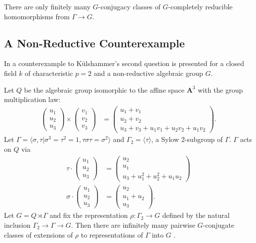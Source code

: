 \begin{theorem} \label{thm:finiteGCR} There are only finitely many $G$-conjugacy classes of $G$-completely reducible homomorphisms from $\Gamma\rightarrow G$.
\end{theorem}
\subsection{A Non-Reductive Counterexample}
In \cite{slodowy1997two} a counterexample to K\"ulshammer's second question is presented for a closed field $k$ of characteristic $p = 2$ and a non-reductive algebraic group $G$.
\begin{example} Let $Q$ be the algebraic group isomorphic to the affine space $\mathbf{A}^3$ with the group multiplication law:
\begin{align*}
	\left(\begin{matrix} u_1 \\ u_2 \\ u_3 \end{matrix}\right) \times
	\left(\begin{matrix} v_1 \\ v_2 \\ v_3 \end{matrix}\right) &=
	\left(\begin{matrix} u_1 + v_1 \\ u_2 + v_2 \\ u_3 + v_3 + u_1v_1 + u_2v_2 + u_1v_2 \end{matrix}\right).
\end{align*}
Let $\Gamma = \langle \sigma, \tau | \sigma^3 = \tau^2 = 1, \tau\sigma\tau = \sigma^2 \rangle$ and $\Gamma_2 = \langle \tau \rangle$, a Sylow 2-subgroup of $\Gamma$. $\Gamma$ acts on $Q$ via
\begin{align*}
	\tau \cdot \left(\begin{matrix} u_1 \\ u_2 \\ u_3 \end{matrix} \right) &=
	\left(\begin{matrix} u_2 \\ u_1 \\ u_3 + u_1^2 + u_2^2 + u_1u_2 \end{matrix} \right) \\
	\sigma \cdot \left(\begin{matrix} u_1 \\ u_2 \\ u_3 \end{matrix} \right) &=
	\left(\begin{matrix} u_2 \\ u_1 + u_2 \\ u_3 \end{matrix} \right).
\end{align*}
Let $G = Q \rtimes \Gamma$ and fix the representation $\rho:\Gamma_2 \rightarrow G$ defined by the natural inclusion $\Gamma_2 \rightarrow \Gamma \rightarrow G$. Then there are infinitely many pairwise $G$-conjugate classes of extensions of $\rho$ to representations of $\Gamma$ into $G$ \cite[Appendix]{slodowy1997two}.
\label{eg:non_red}
\end{example}
